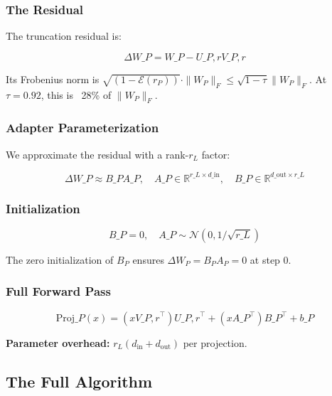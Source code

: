 \subsubsection{The Residual}

The truncation residual is:

\[
\Delta W\_P = W\_P - U\_{P, r} V\_{P, r}
\tag{4.6}
\]

Its Frobenius norm is $\sqrt{(1 - \mathcal{E}(r_P))} \cdot \|W_P\|_F \leq \sqrt{1 - \tau} \|W_P\|_F$. 
At $\tau = 0.92$, this is ~28\% of $\|W_P\|_F$.

\subsubsection{Adapter Parameterization}

We approximate the residual with a rank-$r_L$ factor:

\[
\Delta W\_P \approx B\_P A\_P, \quad
A\_P \in \mathbb{R}^{r\_L \times d\_\text{in}}, \quad
B\_P \in \mathbb{R}^{d\_\text{out} \times r\_L}
\tag{4.7}
\]

\subsubsection{Initialization}

\[
B\_P = 0, \quad A\_P \sim \mathcal{N}(0, 1/\sqrt{r\_L})
\tag{4.8}
\]

The zero initialization of $B_P$ ensures $\Delta W_P = B_P A_P = 0$ at step 0.

\subsubsection{Full Forward Pass}

\[
\text{Proj}\_P(x) = (x V\_{P, r}^\top) U\_{P, r}^\top + (x A\_P^\top) B\_P^\top + b\_P
\tag{4.9}
\]

\textbf{Parameter overhead:} $r_L (d_\text{in} + d_\text{out})$ per projection.

\subsection{The Full Algorithm}

